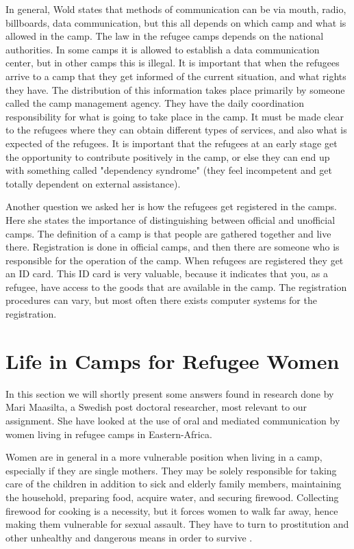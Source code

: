 In general, Wold states that methods of communication can be via mouth, radio, billboards, data communication, but this all depends on which camp and what is allowed in the camp. The law in the refugee camps depends on the national authorities. In some camps it is allowed to establish a data communication center, but in other camps this is illegal. It is important that when the refugees arrive to a camp that they get informed of the current situation, and what rights they have. The distribution of this information takes place primarily by someone called the camp management agency. They have the daily coordination responsibility for what is going to take place in the camp. It must be made clear to the refugees where they can obtain different types of services, and also what is expected of the refugees. It is important that the refugees at an early stage get the opportunity to contribute positively in the camp, or else they can end up with something called "dependency syndrome" (they feel incompetent and get totally dependent on external assistance). 

Another question we asked her is how the refugees get registered in the camps. Here she states the importance of distinguishing between official and unofficial camps. The definition of a camp is that people are gathered together and live there. Registration is done in official camps, and then there are someone who is responsible for the operation of the camp. When refugees are registered they get an ID card. This ID card is very valuable, because it indicates that you, as a refugee, have access to the goods that are available in the camp. The registration procedures can vary, but most often there exists computer systems for the registration.


\section{Life in Camps for Refugee Women}
In this section we will shortly present some answers found in research done by Mari Maasilta, a Swedish post doctoral researcher, most relevant to our assignment. She have looked at the use of oral and mediated communication by women living in refugee camps in Eastern-Africa. 

Women are in general in a more vulnerable position when living in a  camp, especially if they are single mothers. They may be solely responsible for taking care of the children in addition to sick and elderly family members, maintaining the household, preparing food, acquire water, and securing firewood. Collecting firewood for cooking is a necessity, but it forces women  to walk far away, hence making them vulnerable for sexual assault. They have to turn to prostitution and other unhealthy and dangerous means in order to survive \cite{womenRefugee}. 

